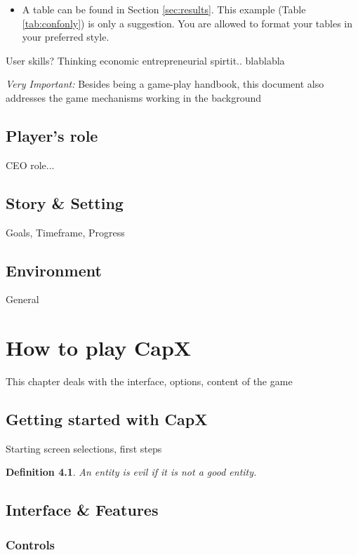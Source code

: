 \documentclass[11pt,titlepage,oneside,openany]{book}
\newtheorem{definition}{Definition}
\begin{document}
\begin{itemize}
	\item A table can be found in Section \ref{sec:results}. This example (Table \ref{tab:confonly}) is only a suggestion. You are allowed to format your tables in your preferred style.
\end{itemize}

User skills? Thinking economic entrepreneurial spirtit.. blablabla

\emph{Very Important:} Besides being a game-play handbook, this document also addresses the game mechanisms working in the background
 
\section{Player's role}
 
CEO role... 

\section{Story \& Setting}

Goals, Timeframe, Progress

\section{Environment}

General 

\chapter{How to play CapX}
\label{cha:theory}
 This chapter deals with the interface, options, content of the game




\section{Getting started with CapX}
\label{sec:prelim}
Starting screen selections, first steps
\begin{definition}
\label{def:evil}
An entity is evil if it is not a good entity.
\end{definition}

\section{Interface \& Features}
\label{sec:good}

\subsection{Controls}
\end{document}

